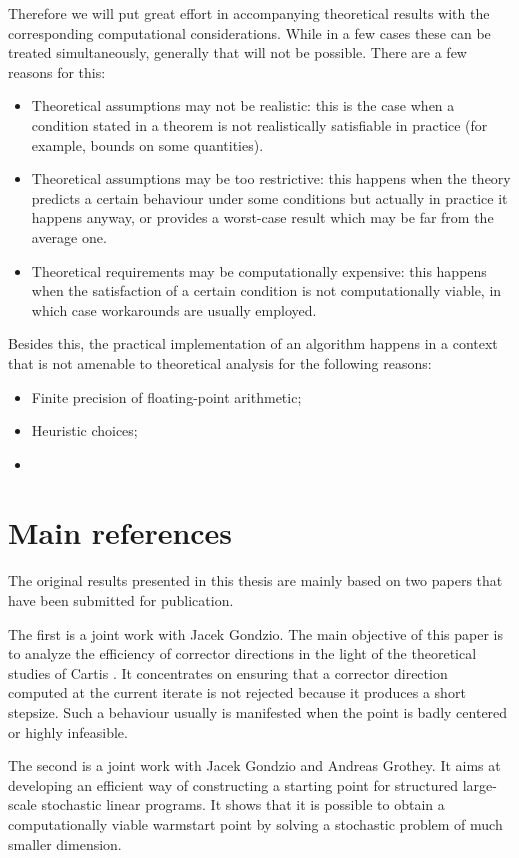 Therefore we will put great effort in accompanying theoretical
results with the corresponding computational considerations. While
in a few cases these can be treated simultaneously, generally that
will not be possible. There are a few reasons for this:
\begin{itemize}
\item Theoretical assumptions may not be realistic: this is the case
when a condition stated in a theorem is not realistically satisfiable 
in practice (for example, bounds on some quantities). 
\item Theoretical assumptions may be too restrictive: this happens
when the theory predicts a certain behaviour under some conditions
but actually in practice it happens anyway, or provides a worst-case 
result which may be far from the average one.
\item Theoretical requirements may be computationally expensive: this 
happens when the satisfaction of a certain condition is not 
computationally viable, in which case workarounds are usually employed.
\end{itemize}

Besides this, the practical implementation of an algorithm happens
in a context that is not amenable to theoretical analysis for the
following reasons:
\begin{itemize}
\item Finite precision of floating-point arithmetic;
\item Heuristic choices;
\item 
\end{itemize}

%
%
\section{Main references}

The original results presented in this thesis are mainly based on two
papers that have been submitted for publication.

The first \cite{ColomboGondzio05} is a joint work with Jacek Gondzio.
The main objective of this paper is to analyze the efficiency of
corrector directions in the light of the theoretical studies of Cartis
\cite{Cartis04,Cartis05}. It concentrates on ensuring that a corrector
direction computed at the current iterate is not rejected because it
produces a short stepsize. Such a behaviour usually is manifested when
the point is badly centered or highly infeasible.

The second \cite{ColomboGondzioGrothey06} is a joint work with
Jacek Gondzio and Andreas Grothey. It aims at developing an
efficient way of constructing a starting point for structured 
large-scale stochastic linear programs.
It shows that it is possible to obtain a computationally viable
warmstart point by solving a stochastic problem of much smaller
dimension.
